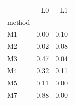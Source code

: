 \begin{tabular}{lrr}
\toprule
 & L0 & L1 \\
method &  &  \\
\midrule
M1 & 0.00 & 0.10 \\
M2 & 0.02 & 0.08 \\
M3 & 0.47 & 0.04 \\
M4 & 0.32 & 0.11 \\
M5 & 0.11 & 0.00 \\
M7 & 0.88 & 0.00 \\
\bottomrule
\end{tabular}
